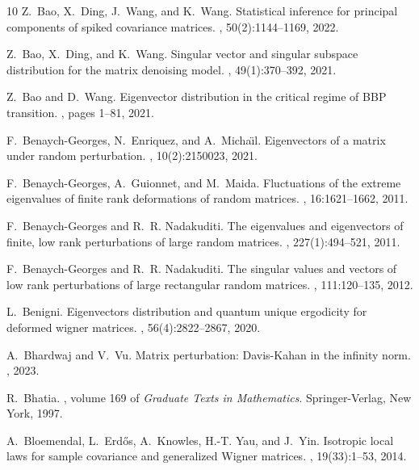 \documentclass[reqno]{amsart}
\theoremstyle{plain}
\theoremstyle{definition}
\begin{document}
\begin{thebibliography}{10}
Z.~Bao, X.~Ding, J.~Wang, and K.~Wang.
\newblock Statistical inference for principal components of spiked covariance
  matrices.
, 50(2):1144--1169, 2022.

Z.~Bao, X.~Ding, and K.~Wang.
\newblock Singular vector and singular subspace distribution for the matrix
  denoising model.
, 49(1):370--392, 2021.

Z.~Bao and D.~Wang.
\newblock Eigenvector distribution in the critical regime of {BBP} transition.
, pages 1--81, 2021.

F.~Benaych-Georges, N.~Enriquez, and A.~Micha\"{\i}l.
\newblock Eigenvectors of a matrix under random perturbation.
, 10(2):2150023, 2021.

F.~Benaych-Georges, A.~Guionnet, and M.~Maida.
\newblock Fluctuations of the extreme eigenvalues of finite rank deformations
  of random matrices.
, 16:1621--1662, 2011.

F.~Benaych-Georges and R.~R. Nadakuditi.
\newblock The eigenvalues and eigenvectors of finite, low rank perturbations of
  large random matrices.
, 227(1):494--521, 2011.

F.~Benaych-Georges and R.~R. Nadakuditi.
\newblock The singular values and vectors of low rank perturbations of large
  rectangular random matrices.
, 111:120--135, 2012.

L.~Benigni.
\newblock Eigenvectors distribution and quantum unique ergodicity for deformed
  wigner matrices.
, 56(4):2822--2867, 2020.

A.~Bhardwaj and V.~Vu.
\newblock Matrix perturbation: Davis-{K}ahan in the infinity norm.
, 2023.

R.~Bhatia.
, volume 169 of {\em Graduate Texts in
  Mathematics}.
\newblock Springer-Verlag, New York, 1997.

A.~Bloemendal, L.~Erd\H{o}s, A.~Knowles, H.-T. Yau, and J.~Yin.
\newblock Isotropic local laws for sample covariance and generalized {W}igner
  matrices.
, 19(33):1--53, 2014.


\end{thebibliography}
\end{document}
